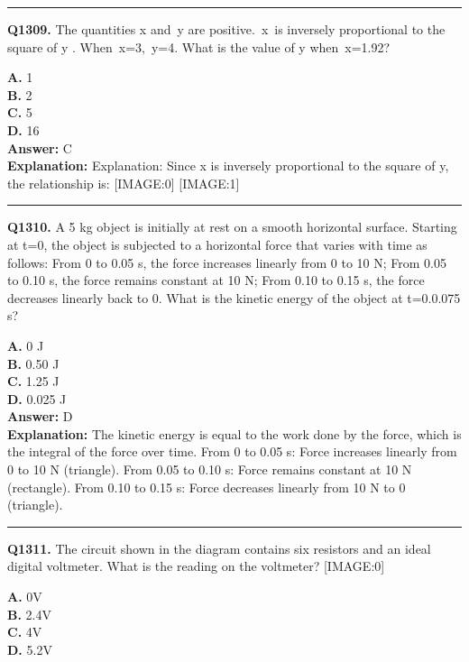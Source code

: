 \documentclass[12pt]{article}
\begin{document}
\hrule
\vspace{1em}


\noindent
\textbf{Q1309.} The quantities
x
and y are positive. x is inversely proportional to the square of
y
. When x=3, y=4. What is the value of
y
when x=1.92?



\textbf{A.} 1 \\
\textbf{B.} 2 \\
\textbf{C.} 5 \\
\textbf{D.} 16 \\

\textbf{Answer:} C \\
\textbf{Explanation:} Explanation: Since x is inversely proportional to the square of y, the relationship is:
[IMAGE:0]
[IMAGE:1]

\hrule
\vspace{1em}


\noindent
\textbf{Q1310.} A 5 kg object is initially at rest on a smooth horizontal surface. Starting at t=0, the object is subjected to a horizontal force that varies with time as follows:
From 0 to 0.05 s, the force increases linearly from 0 to 10 N;
From 0.05 to 0.10 s, the force remains constant at 10 N;
From 0.10 to 0.15 s, the force decreases linearly back to 0.
What is the kinetic energy of the object at t=0.0.075 s?



\textbf{A.} 0 J \\
\textbf{B.} 0.50 J \\
\textbf{C.} 1.25 J \\
\textbf{D.} 0.025 J \\

\textbf{Answer:} D \\
\textbf{Explanation:} The kinetic energy is equal to the work done by the force, which is the integral of the force over time.
From 0 to 0.05 s: Force increases linearly from 0 to 10 N (triangle).
From 0.05 to 0.10 s: Force remains constant at 10 N (rectangle).
From 0.10 to 0.15 s: Force decreases linearly from 10 N to 0 (triangle).

\hrule
\vspace{1em}


\noindent
\textbf{Q1311.} The circuit shown in the diagram contains six resistors and an ideal digital voltmeter.
What is the reading on the voltmeter?
[IMAGE:0]



\textbf{A.} 0V \\
\textbf{B.} 2.4V \\
\textbf{C.} 4V \\
\textbf{D.} 5.2V \\
\end{document}

